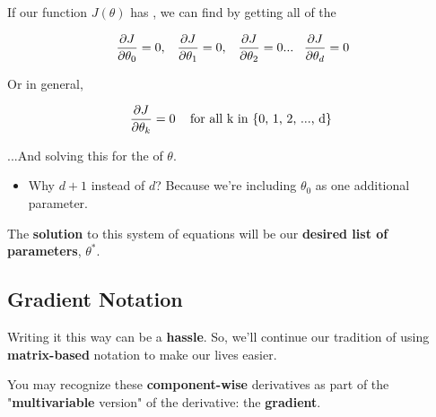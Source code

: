         \begin{concept}
            If our function $J(\theta)$ has   , we can  find  by getting all of the 
            
            \begin{equation*}
                \frac{\partial J}{\partial \theta_0} = 0, \;\;\;
                \frac{\partial J}{\partial \theta_1} = 0, \;\;\;
                \frac{\partial J}{\partial \theta_2} = 0... \;\;\;
                \frac{\partial J}{\partial \theta_d} = 0
            \end{equation*}
            
            Or in general, 
            
            \begin{equation*}
                \frac{\partial J}{\partial \theta_k} = 0 \;\;\; \text{ for all k in \{0, 1, 2, ..., d\} }
            \end{equation*}
            
            ...And solving this  for the  of $\theta$.

            \subsecdiv

            \begin{itemize}
                \item Why $d+1$ instead of $d$? Because we're including $\theta_0$ as one additional parameter.
            \end{itemize}
            
        \end{concept}
        
        
        The \textbf{solution} to this system of equations will be our \textbf{desired list of parameters}, $\theta^*$.
        
    \subsection{Gradient Notation}
    
        Writing it this way can be a \textbf{hassle}. So, we'll continue our tradition of using \textbf{matrix-based} notation to make our lives easier.
        
        You may recognize these \textbf{component-wise} derivatives as part of the "\textbf{multivariable} version" of the derivative: the \textbf{gradient}.\\
        
